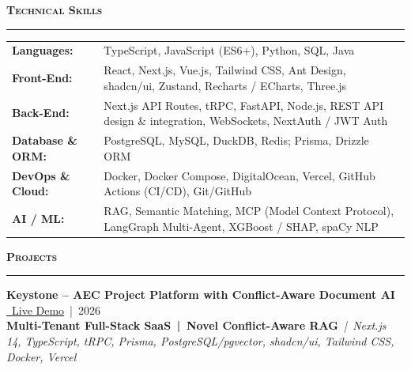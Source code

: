 \documentclass[a4paper,10pt]{article}
\newcommand{\sectionHeader}[2]{%
  \vspace{1.5pt}%
  \noindent%
  {\normalsize\bfseries\color{HeaderDark}#2\enspace\textsc{#1}}%
  \\[-6pt]%
  {\color{SectionLine}\rule{\textwidth}{1pt}}%
  \vspace{1pt}\par%
}
\newcommand{\projectEntry}[4]{%
  \vspace{1pt}%
  \noindent\textbf{\color{HeaderDark}#1} \hfill {\small\color{SubText}#2}\\[-4pt]%
  {\scriptsize\color{AccentTeal}\textbf{#3}} {\scriptsize\color{TechTag}\textit{\,|\, #4}}%
  \vspace{0pt}\par%
}
\begin{document}
\sectionHeader{Technical Skills}{\faCogs}

\vspace{1pt}
\begin{tabularx}{\textwidth}{@{}l X@{}}
  {\small\textbf{\color{HeaderDark}Languages:}} & {\small TypeScript, JavaScript (ES6+), Python, SQL, Java} \\[2pt]
  {\small\textbf{\color{HeaderDark}Front-End:}} & {\small React, Next.js, Vue.js, Tailwind CSS, Ant Design, shadcn/ui, Zustand, Recharts / ECharts, Three.js} \\[2pt]
  {\small\textbf{\color{HeaderDark}Back-End:}} & {\small Next.js API Routes, tRPC, FastAPI, Node.js, REST API design \& integration, WebSockets, NextAuth / JWT Auth} \\[2pt]
  {\small\textbf{\color{HeaderDark}Database \& ORM:}} & {\small PostgreSQL, MySQL, DuckDB, Redis; Prisma, Drizzle ORM} \\[2pt]
  {\small\textbf{\color{HeaderDark}DevOps \& Cloud:}} & {\small Docker, Docker Compose, DigitalOcean, Vercel, GitHub Actions (CI/CD), Git/GitHub} \\[2pt]
  {\small\textbf{\color{HeaderDark}AI / ML:}} & {\small RAG, Semantic Matching, MCP (Model Context Protocol), LangGraph Multi-Agent, XGBoost / SHAP, spaCy NLP} \\
\end{tabularx}


\sectionHeader{Projects}{\faProjectDiagram}

\projectEntry{Keystone -- AEC Project Platform with Conflict-Aware Document AI}
  {\href{https://keystone-app-two.vercel.app}{\color{LinkBlue}\faGlobe~Live Demo} \,|\, 2026}
  {Multi-Tenant Full-Stack SaaS \,|\, Novel Conflict-Aware RAG}
  {Next.js 14, TypeScript, tRPC, Prisma, PostgreSQL/pgvector, shadcn/ui, Tailwind CSS, Docker, Vercel}
\end{document}
